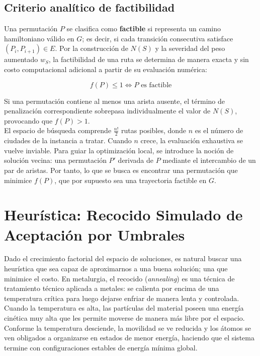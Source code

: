 \documentclass[9pt,a4paper,twocolumn,twoside]{tau-class/tau}
\begin{document}
    \subsection{Criterio anal\'itico de factibilidad}

		Una permutación $P$ se clasifica como \textbf{factible} si representa un camino hamiltoniano válido en $G$; es decir, si cada transición consecutiva satisface $(P_i, P_{i+1}) \in E$. Por la construcción de $N(S)$ y la severidad del peso aumentado $w_S$, la factibilidad de una ruta se determina de manera exacta y sin costo computacional adicional a partir de su evaluación numérica:
        
        \begin{equation}
            f(P) \le 1 \iff P \text{ es factible}
        \end{equation}
        
        Si una permutación contiene al menos una arista ausente, el término de penalización correspondiente sobrepasa individualmente el valor de $N(S)$, provocando que $f(P) > 1$.\\

        El espacio de b\'usqueda comprende $\frac{n!}{2}$ rutas posibles, donde $n$ es el n\'umero de ciudades de la instancia a tratar. Cuando $n$ crece, la evaluaci\'on exhaustiva se vuelve inviable. Para guiar la optimización local, se introduce la noción de solución vecina: una permutación $P'$ derivada de $P$ mediante el intercambio de un par de aristas. Por tanto, lo que se busca es encontrar una permutaci\'on que minimice $f(P)$, que por supuesto sea una trayectoria factible en $G$.




\section{Heur\'istica: Recocido Simulado de Aceptaci\'on por Umbrales }\label{sec:heuristica}

Dado el crecimiento factorial del espacio de soluciones, es natural buscar una heur\'istica que sea capaz de aproximarnos a una buena soluci\'on; una que minimice el costo. En metalurgia, el recocido (\textit{annealing}) es una t\'ecnica de tratamiento t\'ecnico aplicada a metales: se calienta por encima de una temperatura cr\'itica para luego dejarse enfriar de manera lenta y controlada. Cuando la temperatura es alta, las part\'iculas del material poseen una energ\'ia cin\'etica muy alta que les permite moverse de manera m\'as libre por el espacio. Conforme la temperatura desciende, la movilidad se ve reducida y los \'atomos se ven obligados a organizarse en estados de menor energ\'ia, haciendo que el sistema termine con configuraciones estables de energ\'ia m\'inima global.\\
\end{document}
